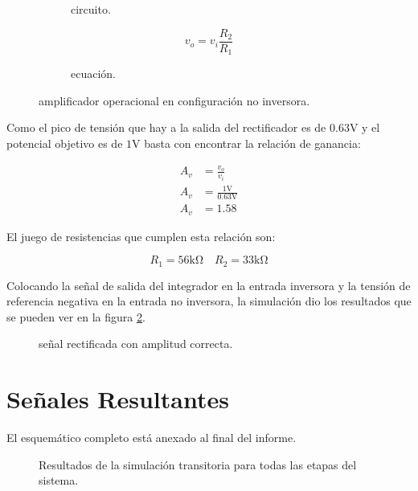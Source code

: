 \begin{figure}[!ht]
  \centering
  \begin{subfigure}[c]{0.6\textwidth}
    
    \caption{circuito.}
    \label{crkt:amplificador.no.inversor}
  \end{subfigure}
  \hfill
  \begin{subfigure}[c]{0.3\textwidth}
    \begin{equation}
      v_o = v_i \frac{R_2}{R_1}
      \label{eq:amplificador.no.inversor.vo}
    \end{equation}
    \caption{ecuación.}
  \end{subfigure}
  \caption{amplificador operacional en configuración no inversora.}
\end{figure}

Como el pico de tensión que hay a la salida del rectificador es de $0.63 \si{\volt}$ y el potencial objetivo es de $1
\si{\volt}$ basta con encontrar la relación de ganancia:

\begin{align*}
  A_v &= \frac{v_o}{v_i} \\
  A_v &= \frac{1 \si{\volt}}{0.63 \si{\volt}} \\
  A_v &= 1.58
\end{align*}

El juego de resistencias que cumplen esta relación son:

\begin{equation*}
  R_1 = 56 \si{\kilo \ohm} \quad R_2 = 33 \si{\kilo \ohm}
\end{equation*}

Colocando la señal de salida del integrador en la entrada inversora y la tensión de referencia negativa en la entrada no
inversora, la simulación dio los resultados que se pueden ver en la figura \ref{plot:rectified}.

\begin{figure}[!ht]
  \centering
  
  \caption{señal rectificada con amplitud correcta.}
  \label{plot:rectified}
\end{figure}

\section{Señales Resultantes}
El esquemático completo está anexado al final del informe.

\begin{figure}[!ht]
    \centering
    
    \caption{Resultados de la simulación transitoria para todas las etapas del sistema.}
    \label{fig:plot_simulacion}
\end{figure}

